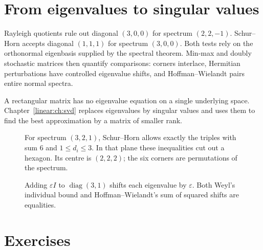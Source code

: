 \section{From eigenvalues to singular values}

Rayleigh quotients rule out diagonal $(3,0,0)$ for spectrum $(2,2,-1)$. Schur--Horn accepts diagonal $(1,1,1)$ for spectrum $(3,0,0)$. Both tests rely on the orthonormal eigenbasis supplied by the spectral theorem. Min-max and doubly stochastic matrices then quantify comparisons: corners interlace, Hermitian perturbations have controlled eigenvalue shifts, and Hoffman--Wielandt pairs entire normal spectra.

A rectangular matrix has no eigenvalue equation on a single underlying space. Chapter~\ref{linear:ch:svd} replaces eigenvalues by singular values and uses them to find the best approximation by a matrix of smaller rank.

\begin{figure}[ht]
\centering{}
\caption{For spectrum $(3,2,1)$, Schur--Horn allows exactly the triples with sum $6$ and $1\le d_i\le3$. In that plane these inequalities cut out a hexagon. Its centre is $(2,2,2)$; the six corners are permutations of the spectrum.}\label{fig:v8c03diagonals}
\end{figure}
\begin{figure}[ht]
\centering{}
\caption{Adding $\varepsilon I$ to $\operatorname{diag}(3,1)$ shifts each eigenvalue by $\varepsilon$. Both Weyl's individual bound and Hoffman--Wielandt's sum of squared shifts are equalities.}\label{fig:v8c03shifts}
\end{figure}

\section{Exercises}

